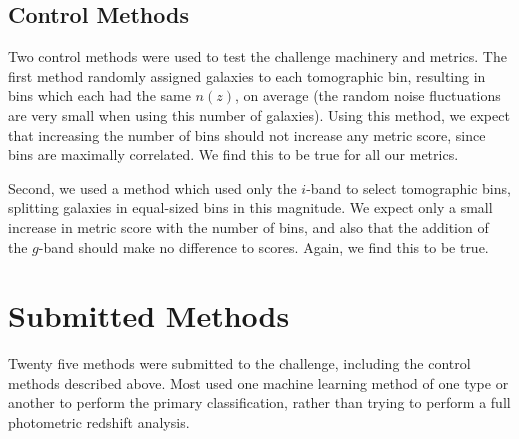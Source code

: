 \documentclass[twocolumn,twocolappendix]{aastex63}
\begin{document}
\subsection{Control Methods}

Two control methods were used to test the challenge machinery and metrics.
The first method randomly assigned galaxies to each tomographic bin, resulting
in bins which each had the same $n(z)$, on average (the random noise fluctuations
are very small when using this number of galaxies).  Using this method, we expect
that increasing the number of bins should not increase any metric score, since bins are
maximally correlated.  We find this to be true for all our metrics.

Second, we used a method which used only the $i$-band to select tomographic bins,
splitting galaxies in equal-sized bins in this magnitude. We expect only a small
increase in metric score with the number of bins, and also that the addition of the $g$-band
should make no difference to scores.  Again, we find this to be true.


\section{Submitted Methods} \label{sec:methods}

Twenty five methods were submitted to the challenge, including the control methods described above.
Most used one machine learning method of one type or another to perform the primary classification,
rather than trying to perform a full photometric redshift analysis.  
\end{document}
